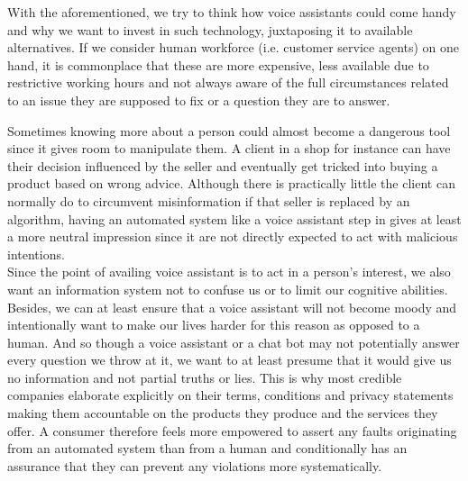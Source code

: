%
With the aforementioned, we try to think how voice assistants could come handy and why we want to invest in such technology, juxtaposing it to available alternatives.
If we consider human workforce (i.e. customer service agents) on one hand, it is commonplace that these are more expensive, less available due to restrictive working hours and not always aware of the full circumstances related to an issue they are supposed to fix or a question they are to answer. 

Sometimes knowing more about a person could almost become a dangerous tool since it gives room to manipulate them. 
A client in a shop for instance can have their decision influenced by the seller and eventually get tricked into buying a product based on wrong advice.
Although there is practically little the client can normally do to circumvent misinformation if that seller is replaced by an algorithm, having an automated system like a voice assistant step in gives at least a more neutral impression since it are not directly expected to act with malicious intentions.\\

Since the point of availing voice assistant is to act in a person's interest, we also want an information system not to confuse us or to limit our cognitive abilities.
Besides, we can at least ensure that a voice assistant will not become moody and intentionally want to make our lives harder for this reason as opposed to a human.
And so though a voice assistant or a chat bot may not potentially answer every question we throw at it, we want to at least presume that it would give us no information and not partial truths or lies.
This is why most credible companies elaborate explicitly on their terms, conditions and privacy statements making them accountable on the products they produce and the services they offer.
A consumer therefore feels more empowered to assert any faults originating from an automated system than from a human and conditionally has an assurance that they can prevent any violations more systematically.\\

